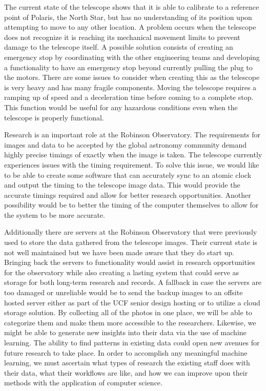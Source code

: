 \documentclass[12pt]{report}
\begin{document}
The current state of the telescope shows that it is able to calibrate to a reference point of Polaris, the North Star, but has no understanding of its position upon attempting to move to any other location.  A problem occurs when the telescope does not recognize it is reaching its mechanical movement limits to prevent damage to the telescope itself.  A possible solution consists of creating an emergency stop by coordinating with the other engineering teams and developing a functionality to have an emergency stop beyond currently pulling the plug to the motors.  There are some issues to consider when creating this as the telescope is very heavy and has many fragile components.  Moving the telescope requires a ramping up of speed and a deceleration time before coming to a complete stop.  This function would be useful for any hazardous conditions even when the telescope is properly functional. 

Research is an important role at the Robinson Observatory.  The requirements for images and data to be accepted by the global astronomy community demand highly precise timings of exactly when the image is taken.  The telescope currently experiences issues with the timing requirement.  To solve this issue, we would like to be able to create some software that can accurately sync to an atomic clock and output the timing to the telescope image data.  This would provide the accurate timings required and allow for better research opportunities.  Another possibility would be to better the timing of the computer themselves to allow for the system to be more accurate.

Additionally there are servers at the Robinson Observatory that were previously used to store the data gathered from the telescope images. Their current state is not well maintained but we have been made aware that they do start up. Bringing back the servers to functionality would assist in research opportunities for the observatory while also creating a lasting system that could serve as storage for both long-term research and records. A fallback in case the servers are too damaged or unreliable would be to send the backup images to an offsite hosted server either as part of the UCF senior design hosting or to utilize a cloud storage solution. By collecting all of the photos in one place, we will be able to categorize them and make them more accessible to the researchers. Likewise, we might be able to generate new insights into their data via the use of machine learning. The ability to find patterns in existing data could open new avenues for future research to take place. In order to accomplish any meaningful machine learning, we must ascertain what types of research the existing staff does with their data, what their workflows are like, and how we can improve upon their methods with the application of computer science.
\end{document}
